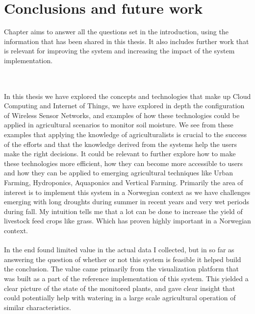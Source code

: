 \documentclass[]{uiophd}
\begin{document}
\chapter{Conclusions and future work}

Chapter aims to answer all the questions set in the introduction, using the information that has been shared in this thesis. It also includes further work that is relevant for improving the system and increasing the impact of the system implementation.


\\\\

In this thesis we have explored the concepts and technologies that make up Cloud Computing and Internet of Things, we have explored in depth the configuration of Wireless Sensor Networks, and examples of how these technologies could be applied in agricultural scenarios to monitor soil moisture. We see from these examples that applying the knowledge of agriculturalists is crucial to the success of the efforts and that the knowledge derived from the systems help the users make the right decisions. It could be relevant to further explore how to make these technologies more efficient, how they can become more accessible to users and how they can be applied to emerging agricultural techniques like Urban Farming, Hydroponics, Aquaponics and Vertical Farming. Primarily the area of interest is to implement this system in a Norwegian context as we have challenges emerging with long droughts during summer in recent years and very wet periods during fall. My intuition tells me that a lot can be done to increase the yield of livestock feed crops like grass. Which has proven highly important in a Norwegian context.
\\\\
In the end found limited value in the actual data I collected, but in so far as answering the question of whether or not this system is feasible it helped build the conclusion. The value came primarily from the visualization platform that was built as a part of the reference implementation of this system. This yielded a clear picture of the state of the monitored plants, and gave clear insight that could potentially help with watering in a large scale agricultural operation of similar characteristics.
\end{document}
